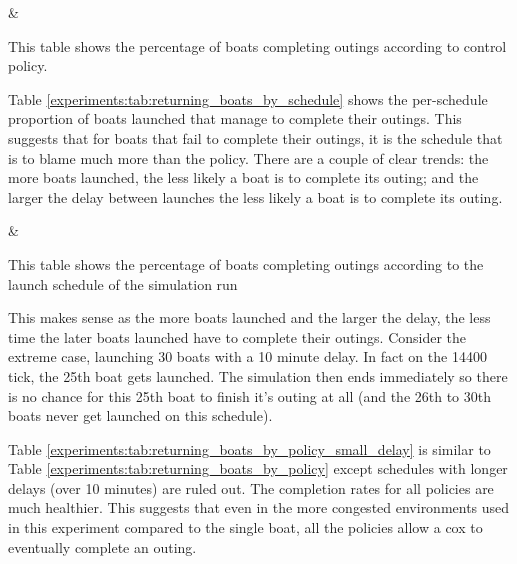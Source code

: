   \begin{table}[h]
  \centering
  {\cp & \landed}
  \caption{This table shows the percentage of boats completing outings according to control policy.}
  \label{experiments:tab:returning_boats_by_policy}
  \end{table}
  
  Table \ref{experiments:tab:returning_boats_by_schedule} shows the per-schedule proportion of boats launched that manage to complete their outings. This suggests that for boats that fail to complete their outings, it is the schedule that is to blame much more than the policy. There are a couple of clear trends: the more boats launched, the less likely a boat is to complete its outing; and the larger the delay between launches the less likely a boat is to complete its outing.

  \begin{table}[h]
  \centering
  {\name & \landed}
  \caption{This table shows the percentage of boats completing outings according to the launch schedule of the simulation run}
  \label{experiments:tab:returning_boats_by_schedule}
  \end{table}
  
  This makes sense as the more boats launched and the larger the delay, the less time the later boats launched have to complete their outings. Consider the extreme case, launching 30 boats with a 10 minute delay. In fact on the 14400 tick, the 25th boat gets launched. The simulation then ends immediately so there is no chance for this 25th boat to finish it's outing at all (and the 26th to 30th boats never get launched on this schedule). 
  
  Table \ref{experiments:tab:returning_boats_by_policy_small_delay} is similar to Table \ref{experiments:tab:returning_boats_by_policy} except schedules with longer delays (over 10 minutes) are ruled out. The completion rates for all policies are much healthier. This suggests that even in the more congested environments used in this experiment compared to the single boat, all the policies allow a cox to eventually complete an outing. 
  
